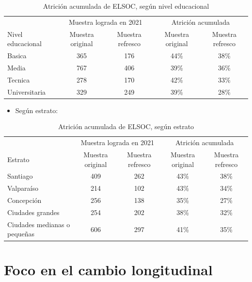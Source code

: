 \documentclass[
  12pt,
]{book}
\providecommand{\tightlist}{%
  \setlength{\itemsep}{0pt}\setlength{\parskip}{0pt}}
\begin{document}
\begin{table}

\caption{\label{tab:tabla-atricion-educ}Atrición acumulada de ELSOC, según nivel educacional}
\centering
\begin{tabular}[t]{l|c|c|c|c}
\hline
\multicolumn{1}{c|}{ } & \multicolumn{2}{c|}{Muestra lograda en 2021} & \multicolumn{2}{c}{Atrición acumulada} \\
\cline{2-3} \cline{4-5}
Nivel educacional & Muestra original & Muestra refresco & Muestra original & Muestra refresco\\
\hline
Basica & 365 & 176 & 44\% & 38\%\\
\hline
Media & 767 & 406 & 39\% & 36\%\\
\hline
Tecnica & 278 & 170 & 42\% & 33\%\\
\hline
Universitaria & 329 & 249 & 39\% & 28\%\\
\hline
\end{tabular}
\end{table}

\begin{itemize}
\tightlist
\item
  Según estrato:
\end{itemize}

\begin{table}

\caption{\label{tab:tabla-atricion-estrato}Atrición acumulada de ELSOC, según estrato}
\centering
\begin{tabular}[t]{l|c|c|c|c}
\hline
\multicolumn{1}{c|}{ } & \multicolumn{2}{c|}{Muestra lograda en 2021} & \multicolumn{2}{c}{Atrición acumulada} \\
\cline{2-3} \cline{4-5}
Estrato & Muestra original & Muestra refresco & Muestra original & Muestra refresco\\
\hline
Santiago & 409 & 262 & 43\% & 38\%\\
\hline
Valparaíso & 214 & 102 & 43\% & 34\%\\
\hline
Concepción & 256 & 138 & 35\% & 27\%\\
\hline
Ciudades
grandes & 254 & 202 & 38\% & 32\%\\
\hline
Ciudades medianas
o pequeñas & 606 & 297 & 41\% & 35\%\\
\hline
\end{tabular}
\end{table}

\hypertarget{foco-en-el-cambio-longitudinal}{%
\section*{Foco en el cambio longitudinal}\label{foco-en-el-cambio-longitudinal}}
\end{document}
